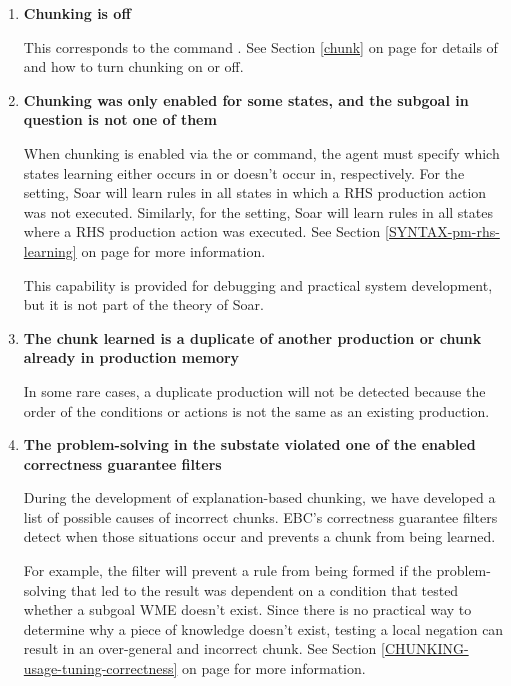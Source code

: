 \begin{enumerate}
	\item \textbf{Chunking is off} 
	
	This corresponds to the command .  See Section \ref{chunk} on page \pageref{chunk} for details of  and how to turn chunking on or off.

	\item \textbf{Chunking was only enabled for some states, and the subgoal in question is not one of them}
	
	When chunking is enabled via the  or  command, the agent must specify which states learning either occurs in or doesn't occur in, respectively.  For the  setting, Soar will learn rules in all states in which a  RHS production action was not executed.  Similarly, for the  setting, Soar will learn rules in all states where a  RHS production action was executed.  See Section \ref{SYNTAX-pm-rhs-learning} on page \pageref{SYNTAX-pm-rhs-learning} for more information.

	This capability is provided for debugging and practical system development, but it is not part of the theory of Soar.

	\item \textbf{The chunk learned is a duplicate of another production or chunk already in production memory}

	In some rare cases, a duplicate production will not be detected because the order of the conditions or actions is not the same as an existing production.

	\item \textbf{The problem-solving in the substate violated one of the enabled correctness guarantee filters}

	During the development of explanation-based chunking, we have developed a list of possible causes of incorrect chunks. EBC's correctness guarantee filters detect when those situations occur and prevents a chunk from being learned.  

	For example, the  filter will prevent a rule from being formed if the problem-solving that led to the result was dependent on a condition that tested whether a subgoal WME doesn't exist.  Since there is no practical way to determine why a piece of knowledge doesn't exist, testing a local negation can result in an over-general and incorrect chunk.  See Section \ref{CHUNKING-usage-tuning-correctness} on page \pageref{CHUNKING-usage-tuning-correctness} for more information. 


\end{enumerate}
